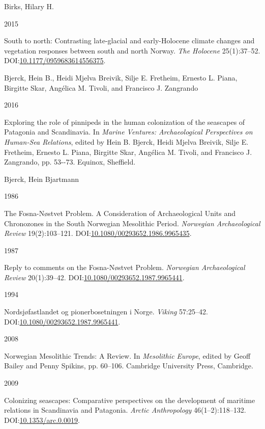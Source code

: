 \documentclass[
  a4paper,
  oneside]{uiophdthesis}
\newlength{\cslhangindent}
\newlength{\csllabelwidth}
\newlength{\cslentryspacingunit} %
\newenvironment{CSLReferences}[2] %
 {%
  \setlength{\parindent}{0pt}
  \ifodd #1
  \let\oldpar\par
  \def\par{\hangindent=\cslhangindent\oldpar}
  \fi
  \setlength{\parskip}{#2\cslentryspacingunit}
 }%
 {}
\newcommand{\CSLBlock}[1]{#1\hfill\break}
\newcommand{\CSLLeftMargin}[1]{\parbox[t]{\csllabelwidth}{#1}}
\newcommand{\CSLRightInline}[1]{\parbox[t]{\linewidth - \csllabelwidth}{#1}\break}
\begin{document}
\begin{CSLReferences}{0}{0}
\leavevmode{}%
\CSLBlock{Birks, Hilary H.}
\CSLLeftMargin{ 2015}
\CSLRightInline{{South to north: Contrasting late-glacial and early-Holocene climate changes and vegetation responses between south and north Norway}. \emph{The Holocene} 25(1):37--52. DOI:\href{https://doi.org/10.1177/0959683614556375}{10.1177/0959683614556375}.}

\leavevmode{}%
\CSLBlock{Bjerck, Hein B., Heidi Mjelva Breivik, Silje E. Fretheim, Ernesto L. Piana, Birgitte Skar, Angélica M. Tivoli, and Francisco J. Zangrando}
\CSLLeftMargin{ 2016}
\CSLRightInline{{Exploring the role of pinnipeds in the human colonization of the seascapes of Patagonia and Scandinavia}. In \emph{{Marine Ventures: Archaeological Perspectives on Human-Sea Relations}}, edited by Hein B. Bjerck, Heidi Mjelva Breivik, Silje E. Fretheim, Ernesto L. Piana, Birgitte Skar, Angélica M. Tivoli, and Francisco J. Zangrando, pp. 53-\/-73. Equinox, Sheffield.}

\leavevmode{}%
\CSLBlock{Bjerck, Hein Bjartmann}
\CSLLeftMargin{ 1986}
\CSLRightInline{{The Fosna-Nøstvet Problem. A Consideration of Archaeological Units and Chronozones in the South Norwegian Mesolithic Period}. \emph{Norwegian Archaeological Review} 19(2):103--121. DOI:\href{https://doi.org/10.1080/00293652.1986.9965435}{10.1080/00293652.1986.9965435}.}

\leavevmode{}%
\CSLLeftMargin{ 1987 }
\CSLRightInline{{Reply to comments on the Fosna-Nøstvet Problem}. \emph{Norwegian Archaeological Review} 20(1):39--42. DOI:\href{https://doi.org/10.1080/00293652.1987.9965441}{10.1080/00293652.1987.9965441}.}

\leavevmode{}%
\CSLLeftMargin{ 1994 }
\CSLRightInline{{Nordsjøfastlandet og pionerbosetningen i Norge}. \emph{Viking} 57:25--42. DOI:\href{https://doi.org/10.1080/00293652.1987.9965441}{10.1080/00293652.1987.9965441}.}

\leavevmode{}%
\CSLLeftMargin{ 2008 }
\CSLRightInline{{Norwegian Mesolithic Trends: A Review}. In \emph{{Mesolithic Europe}}, edited by Geoff Bailey and Penny Spikins, pp. 60--106. Cambridge University Press, Cambridge.}

\leavevmode{}%
\CSLLeftMargin{ 2009 }
\CSLRightInline{{Colonizing seascapes: Comparative perspectives on the development of maritime relations in Scandinavia and Patagonia}. \emph{Arctic Anthropology} 46(1--2):118--132. DOI:\href{https://doi.org/10.1353/arc.0.0019}{10.1353/arc.0.0019}.}


\end{CSLReferences}
\end{document}
